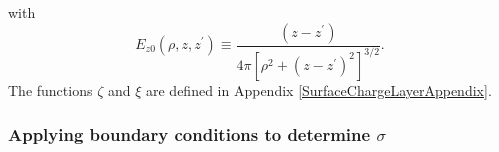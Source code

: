 \documentclass[letterpaper]{article}
\begin{document}
with 
$$ E_{z0}(\rho, z, z^\prime)
   \equiv 
   \frac{(z-z^\prime)}{4\pi[\rho^2 + (z-z^\prime)^2]^{3/2}}.
$$
The functions $\zeta$ and $\xi$ are defined in 
Appendix \ref{SurfaceChargeLayerAppendix}.

\subsubsection{Applying boundary conditions to determine $\sigma$}
\end{document}
